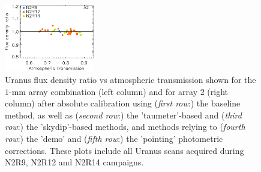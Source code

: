 \begin{figure}[ht!]
\begin{center}
  \includegraphics[clip=true, trim={0, -0.3cm, -0.3cm, 0}, width=0.35\textwidth]{Figures/Calibration/plot_flux_density_ratio_obstau_uranus_corrected_skydip_photocorr_pointing_narrow_a2.pdf}
  \caption[Uranus flux density stability against atmospheric
    transmission]{Uranus flux density ratio vs atmospheric transmission
    shown for the $1$-mm array
    combination (left column) and for array 2 (right column) after absolute
    calibration using (\emph{first row}:) the baseline method, as
    well as (\emph{second row}:) the 'taumeter'-based and
    (\emph{third row}:) the 'skydip'-based methods, and methods
    relying to (\emph{fourth row}:) the 'demo' and (\emph{fifth
      row}:) the 'pointing' photometric corrections. These plots
    include all Uranus scans acquired during N2R9, N2R12 and N2R14
    campaigns. }
  \label{fig:calib_uranus_vs_atmtrans_all}
\end{center}
\end{figure}



